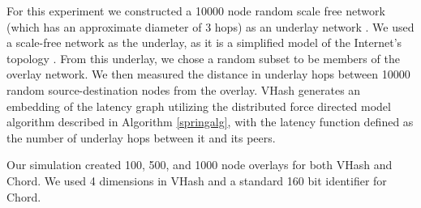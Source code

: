 \documentclass[10pt, conference, letterpaper]{IEEEtran}
\begin{document}
For this experiment we constructed a 10000 node random scale free network (which has an approximate diameter of 3 hops) as an underlay network \cite{cohen2000resilience} \cite{pastor2001epidemic} \cite{hagberg2004}.
We used a scale-free network as the underlay, as it is a simplified model of the Internet's topology \cite{cohen2000resilience} \cite{pastor2001epidemic}.
From this underlay, we chose a random subset to be members of the overlay network.
We then measured the distance in underlay hops between 10000 random source-destination nodes from the overlay. 
VHash generates an embedding of the latency graph utilizing the distributed force directed model algorithm described in Algorithm \ref{springalg}, with the latency function defined as the number of underlay hops between it and its peers.

Our simulation created 100, 500, and 1000 node overlays for both VHash and Chord.
We used 4 dimensions in VHash and a standard 160 bit identifier for Chord.
\end{document}
